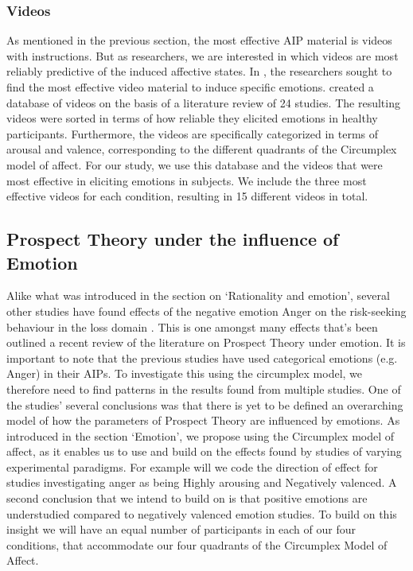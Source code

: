 \documentclass{article}
\begin{document}
    \subsubsection{Videos}
    As mentioned in the previous section, the most effective AIP material is videos with instructions. But as researchers, we are interested in which videos are most reliably predictive of the induced affective states. In , the researchers sought to find the most effective video material to induce specific emotions.  created a database of videos on the basis of a literature review of 24 studies. The resulting videos were sorted in terms of how reliable they elicited emotions in healthy participants. Furthermore, the videos are specifically categorized in terms of arousal and valence, corresponding to the different quadrants of the Circumplex model of affect. 
For our study, we use this database and the videos that were most effective in eliciting emotions in subjects. We include the three most effective videos for each condition, resulting in 15 different videos in total. 

    \subsection{Prospect Theory under the influence of Emotion}
    Alike what was introduced in the section on ‘Rationality and emotion’, several other studies have found effects of the negative emotion Anger on the risk-seeking behaviour in the loss domain \cite{prietzel2020mrq}. This is one amongst many effects that’s been outlined a recent review of the literature on Prospect Theory under emotion. It is important to note that the previous studies have used categorical emotions (e.g. Anger) in their AIPs. To investigate this using the circumplex model, we therefore need to find patterns in the results found from multiple studies. 
One of the studies' several conclusions was that there is yet to be defined an overarching model of how the parameters of Prospect Theory are influenced by emotions. As introduced in the section ‘Emotion’, we propose using the Circumplex model of affect, as it enables us to use and build on the effects found by studies of varying experimental paradigms. For example will we code the direction of effect for studies investigating anger as being Highly arousing and Negatively valenced.
A second conclusion that we intend to build on is that positive emotions are understudied compared to negatively valenced emotion studies. To build on this insight we will have an equal number of participants in each of our four conditions, that accommodate our four quadrants of the Circumplex Model of Affect.
\end{document}
